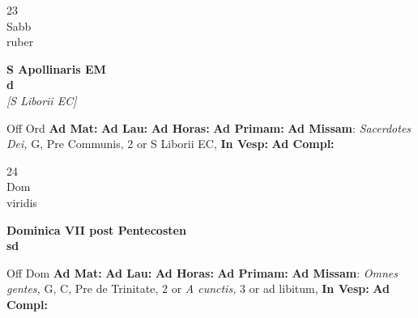 \documentclass[10pt, openany]{book}
\begin{document}
    \begin{center}
        \begin{minipage}{3.5in}
            \vspace{2em}
            \begin{minipage}{0.5in}
                {\Huge 23} \\
                {\normalsize Sabb} \\
                {\normalsize ruber}
            \end{minipage}
            \begin{minipage}{3.0in}
                \textbf{ \large S Apollinaris EM \\
                \textnormal{\normalsize d}} \\ \textit{[S Liborii EC]} \\ 
            \end{minipage}
            \begin{justify}Off Ord
                \textbf{Ad Mat: }
                \textbf{Ad Lau: }
                \textbf{Ad Horas: }
                \textbf{Ad Primam: }\textbf{Ad Missam}: \textit{Sacerdotes Dei,} G, Pre Communis, 2 or S Liborii EC,  
                \textbf{In Vesp: }
                \textbf{Ad Compl: }
            \end{justify}
        \end{minipage}
    \end{center}

    \begin{center}
        \begin{minipage}{3.5in}
            \vspace{2em}
            \begin{minipage}{0.5in}
                {\Huge 24} \\
                {\normalsize Dom} \\
                {\normalsize viridis}
            \end{minipage}
            \begin{minipage}{3.0in}
                \textbf{ \large Dominica VII post Pentecosten \\
                \textnormal{\normalsize sd}} \\ 
            \end{minipage}
            \begin{justify}Off Dom
                \textbf{Ad Mat: }
                \textbf{Ad Lau: }
                \textbf{Ad Horas: }
                \textbf{Ad Primam: }\textbf{Ad Missam}: \textit{Omnes gentes,} G, C, Pre de Trinitate, 2 or \textit{A cunctis,} 3 or ad libitum,  
                \textbf{In Vesp: }
                \textbf{Ad Compl: }
            \end{justify}
        \end{minipage}
    \end{center}
\end{document}
